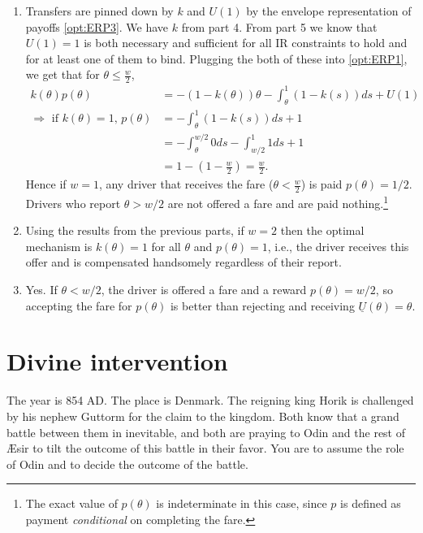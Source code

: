 \documentclass[a4paper]{article}
\begin{document}
\begin{enumerate}
	\item %
	Transfers are pinned down by $k$ and $U(1)$ by the envelope representation of payoffs \eqref{opt:ERP3}. We have $k$ from part 4. From part 5 we know that $U(1)=1$ is both necessary and sufficient for all IR constraints to hold and for at least one of them to bind. Plugging the both of these into \eqref{opt:ERP1}, we get that for $\theta \leq \frac{w}{2}$,
	\begin{align*}
		k(\theta)p(\theta) &= -(1-k(\theta)) \theta - \int_{\theta}^{1} (1-k(s)) ds + U(1)
		\\
		\Rightarrow \text{ if $k(\theta)=1$, } p(\theta) &= - \int_{\theta}^{1} (1-k(s)) ds + 1
		\\
		&= - \int_{\theta}^{w/2} 0 ds - \int_{w/2}^1 1 ds + 1
		\\
		&= 1 - \left(1-\frac{w}{2}\right) = \frac{w}{2}.
	\end{align*}
	Hence if $w=1$, any driver that receives the fare ($\theta < \frac{w}{2}$) is paid $p(\theta) = 1/2$. Drivers who report $\theta > w/2$ are not offered a fare and are paid nothing.\footnote{The exact value of $p(\theta)$ is indeterminate in this case, since $p$ is defined as payment \emph{conditional} on completing the fare.}
	
	\item Using the results from the previous parts, if $w=2$ then the optimal mechanism is $k(\theta) = 1$ for all $\theta$ and $p(\theta)=1$, i.e., the driver receives this offer and is compensated handsomely regardless of their report.
	
	\item Yes. If $\theta < w/2$, the driver is offered a fare and a reward $p(\theta) = w/2$, so accepting the fare for $p(\theta)$ is better than rejecting and receiving $\underline{U}(\theta)=\theta$.
\end{enumerate}
\fi



\section{Divine intervention}

The year is 854 AD. The place is Denmark. The reigning king Horik is challenged by his nephew Guttorm for the claim to the kingdom. Both know that a grand battle between them in inevitable, and both are praying to Odin and the rest of {\AE}sir to tilt the outcome of this battle in their favor. You are to assume the role of Odin and to decide the outcome of the battle.
\end{document}
